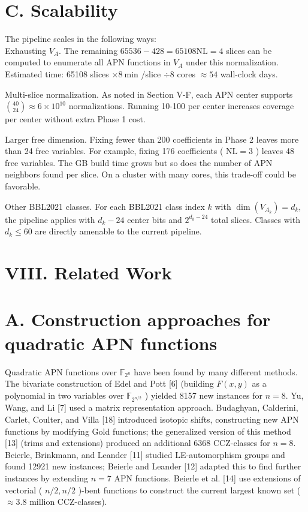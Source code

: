 \documentclass[10pt]{article}
\begin{document}
\section*{C. Scalability}
The pipeline scales in the following ways:\\
Exhausting $V_{A}$. The remaining $65536-428=65108 \mathrm{NL}=4$ slices can be computed to enumerate all APN functions in $V_{A}$ under this normalization. Estimated time: 65108 slices $\times 8 \mathrm{~min}$ /slice $\div 8$ cores $\approx 54$ wall-clock days.

Multi-slice normalization. As noted in Section V-F, each APN center supports $\binom{40}{24} \approx 6 \times 10^{10}$ normalizations. Running 10-100 per center increases coverage per center without extra Phase 1 cost.

Larger free dimension. Fixing fewer than 200 coefficients in Phase 2 leaves more than 24 free variables. For example, fixing 176 coefficients ( $\mathrm{NL}=3$ ) leaves 48 free variables. The GB build time grows but so does the number of APN neighbors found per slice. On a cluster with many cores, this trade-off could be favorable.

Other BBL2021 classes. For each BBL2021 class index $k$ with $\operatorname{dim}\left(V_{A_{k}}\right)=d_{k}$, the pipeline applies with $d_{k}-24$ center bits and $2^{d_{k}-24}$ total slices. Classes with $d_{k} \leq 60$ are directly amenable to the current pipeline.

\section*{VIII. Related Work}
\section*{A. Construction approaches for quadratic APN functions}
Quadratic APN functions over $\mathbb{F}_{2^{n}}$ have been found by many different methods. The bivariate construction of Edel and Pott [6] (building $F(x, y)$ as a polynomial in two variables over $\mathbb{F}_{2^{n / 2}}$ ) yielded 8157 new instances for $n=8$. Yu, Wang, and Li [7] used a matrix representation approach. Budaghyan, Calderini, Carlet, Coulter, and Villa [18] introduced isotopic shifts, constructing new APN functions by modifying Gold functions; the generalized version of this method [13] (trims and extensions) produced an additional 6368 CCZ-classes for $n=8$. Beierle, Brinkmann, and Leander [11] studied LE-automorphism groups and found 12921 new instances; Beierle and Leander [12] adapted this to find further instances by extending $n=7$ APN functions. Beierle et al. [14] use extensions of vectorial ( $n / 2, n / 2$ )-bent functions to construct the current largest known set ( $\approx 3.8$ million CCZ-classes).
\end{document}
